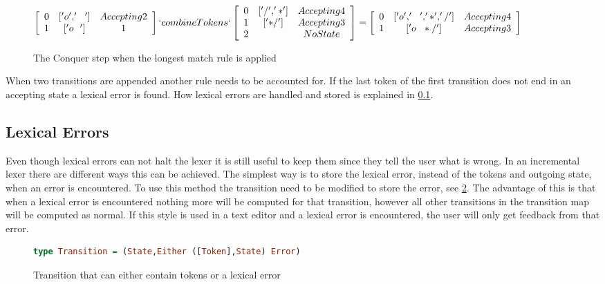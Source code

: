\begin{figure}[!ht]
\begin{center}
$\left[\begin{array}{ccc}
0&['o','~~']& Accepting 2\\
1&['o~~'] & 1\\
\end{array}\right] `combineTokens` 
\left[\begin{array}{ccc}
0&['/','*']&Accepting 4\\
1&['*/']&Accepting 3\\
2& &NoState\\
\end{array}\right] =
\left[\begin{array}{ccc}
0&['o','~~','*','/']&Accepting 4\\
1&['o~~*/']& Accepting 3\\
\end{array}\right]$
\caption{The Conquer step when the longest match rule is applied\label{fig:longconq}}
\end{center}
\end{figure}

When two transitions are appended another rule needs to be accounted for. If the
last token of the first transition does not end in an accepting state a lexical
error is found. How lexical errors are handled and stored is explained in
\cref{sec:lexerr}.

\subsection{Lexical Errors}\label{sec:lexerr}
Even though lexical errors can not halt the lexer it is still useful to keep
them since they tell the user what is wrong. In an incremental lexer there are
different ways this can be achieved. The simplest way is to store the lexical
error, instead of the tokens and outgoing state, when an error is encountered.
To use this method the transition need to be modified to store the error, see
\cref{fig:error1}. The advantage of this is that when a lexical error is
encountered nothing more will be computed for that transition, however all other
transitions in the transition map will be computed as normal. If this style is
used in a text editor and a lexical error is encountered, the user will only get
feedback from that error.

\begin{figure}[!ht]
\begin{lstlisting}[language=Haskell]
type Transition = (State,Either ([Token],State) Error)
\end{lstlisting}
\caption{Transition that can either contain tokens or a lexical error\label{fig:error1}}
\end{figure}

